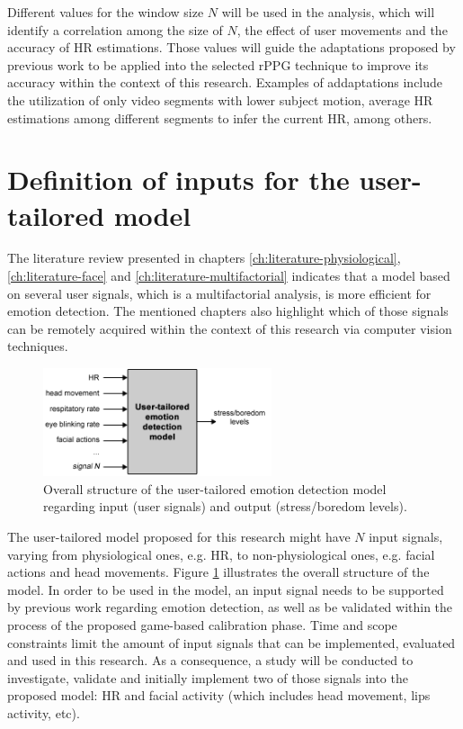 Different values for the window size $N$ will be used in the analysis, which will identify a correlation among the size of $N$, the effect of user movements and the accuracy of HR estimations. Those values will guide the adaptations proposed by previous work \parencite{li2014remote} to be applied into the selected rPPG technique to improve its accuracy within the context of this research. Examples of addaptations include the utilization of only video segments with lower subject motion, average HR estimations among different segments to infer the current HR, among others.

\section{Definition of inputs for the user-tailored model}
\label{sec:closing-definition-inputs}

The literature review presented in chapters \ref{ch:literature-physiological}, \ref{ch:literature-face} and \ref{ch:literature-multifactorial} indicates that a model based on several user signals, which is a multifactorial analysis, is more efficient for emotion detection. The mentioned chapters also highlight which of those signals can be remotely acquired within the context of this research via computer vision techniques.

\begin{figure}[h]
    \centering
    \includegraphics[width=0.6\textwidth]{figures/model-inputs-set.png}
    \caption{Overall structure of the user-tailored emotion detection model regarding input (user signals) and output (stress/boredom levels).}
    \label{fig:model-inputs-set}
\end{figure}

The user-tailored model proposed for this research might have $N$ input signals, varying from physiological ones, e.g. HR, to non-physiological ones, e.g. facial actions and head movements. Figure \ref{fig:model-inputs-set} illustrates the overall structure of the model. In order to be used in the model, an input signal needs to be supported by previous work regarding emotion detection, as well as be validated within the process of the proposed game-based calibration phase. Time and scope constraints limit the amount of input signals that can be implemented, evaluated and used in this research. As a consequence, a study will be conducted to investigate, validate and initially implement two of those signals into the proposed model: HR and facial activity (which includes head movement, lips activity, etc).


